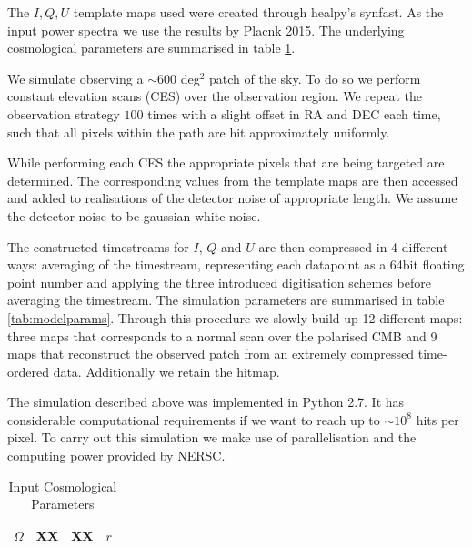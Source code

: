 \documentclass[apj]{emulateapj}
\newcommand{\sqdeg}{deg$^2$ }
\begin{document}
The $I, Q, U$ template maps used were created through healpy's synfast. As the input power spectra we use the results by Placnk 2015. The underlying cosmological parameters are summarised in table \ref{tab:inputcosparams}.

We simulate observing a $\sim 600$ \sqdeg patch of the sky. To do so we perform constant elevation scans (CES) over the observation region. We repeat the observation strategy $100$ times with a slight offset in RA and DEC each time, such that all pixels within the path are hit approximately uniformly. 

While performing each CES the appropriate pixels that are being targeted are determined. The corresponding values from the template maps are then accessed and added to realisations of the detector noise of appropriate length. We assume the detector noise to be gaussian white noise.

The constructed timestreams for $I$, $Q$ and $U$ are then compressed in 4 different ways: averaging of the timestream, representing each datapoint as a 64bit floating point number and applying the three introduced digitisation schemes before averaging the timestream. The simulation parameters are summarised in table \ref{tab:modelparams}. Through this procedure we slowly build up 12 different maps: three maps that corresponds to a normal scan over the polarised CMB and 9 maps that reconstruct the observed patch from an extremely compressed time-ordered data. Additionally we retain the hitmap.

The simulation described above was implemented in Python 2.7. It has considerable computational requirements if we want to reach up to $\sim 10^8$ hits per pixel. To carry out this simulation we make use of parallelisation and the computing power provided by NERSC.

\begin{table}[tbh]
\begin{center}
\caption{\label{tab:inputcosparams} Input Cosmological Parameters}
\small
\begin{tabular}{l | c c c }
$\Omega$ & XX&XX&$r$\\
\hline

\end{tabular}
 \normalsize
\end{center}
\end{table}
\end{document}
